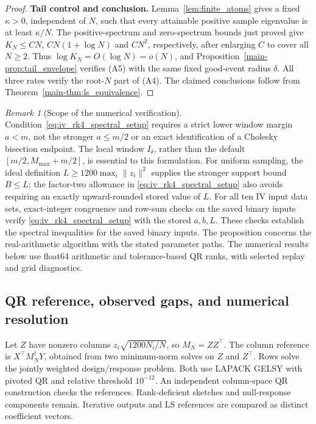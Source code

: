 \documentclass[11pt,a4paper,leqno]{article}
\numberwithin{equation}{section}
\numberwithin{figure}{section}
\numberwithin{table}{section}
\theoremstyle{plain}
\theoremstyle{definition}
\theoremstyle{remark}
\newtheorem{remark}[lemma]{Remark}
\begin{document}
\begin{proof}
\medskip\noindent\textbf{Tail control and conclusion.}
Lemma~\ref{lem:finite_atoms} gives a fixed $\kappa>0$, independent of $N$, such that every
attainable positive sample eigenvalue is at least $\kappa/N$.
The positive-spectrum and zero-spectrum bounds just proved give
$K_N\le CN$, $CN(1+\log N)$ and $CN^2$, respectively, after enlarging
$C$ to cover all $N\ge2$. Thus $\log K_N=O(\log N)=o(N)$, and
Proposition~\ref{main-prop:tail_envelope} verifies (A5) with the same
fixed good-event radius $\delta$. All three rates verify the root-$N$
part of (A4). The claimed conclusions follow from
Theorem~\ref{main-thm:ls_equivalence}.
\end{proof}

\begin{remark}[Scope of the numerical verification]
\label{rem:iv_rk4_scope}
Condition~\eqref{eq:iv_rk4_spectral_setup} requires a strict lower
window margin $a<m$, not the stronger $a\le m/2$ or an exact identification
of a Cholesky bisection endpoint. The local window $I_\delta$, rather
than the default $[m/2,M_{\max}+m/2]$, is essential to this formulation.
For uniform sampling, the ideal definition
$L\ge1200\max_i\|z_i\|^2$ supplies the stronger support bound $B\le L$;
the factor-two allowance in \eqref{eq:iv_rk4_spectral_setup} also avoids
requiring an exactly upward-rounded stored value of $L$.
For all ten IV input data sets, exact-integer congruence and row-sum
checks on the saved binary inputs verify
\eqref{eq:iv_rk4_spectral_setup} with the stored $a,b,L$.
These checks establish the spectral inequalities for the saved binary inputs.
The proposition concerns the real-arithmetic algorithm with the stated
parameter paths. The numerical results below use float64 arithmetic and
tolerance-based QR ranks, with selected replay and grid diagnostics.
\end{remark}


\subsection{QR reference, observed gaps, and numerical resolution}
\label{supp:subsec:ls_numerics}
Let $Z$ have nonzero columns $z_i\sqrt{1200N_i/N}$, so $M_N=ZZ^\top$.
The column reference is $X^\top M_N^\dagger Y$, obtained from two
minimum-norm solves on $Z$ and $Z^\top$. Rows solve the jointly weighted
design/response problem. Both use LAPACK GELSY with pivoted QR and relative
threshold $10^{-12}$. An independent column-space QR construction checks
the references. Rank-deficient sketches and null-response components remain.
Iterative outputs and LS references are compared as distinct coefficient vectors.
\end{document}
